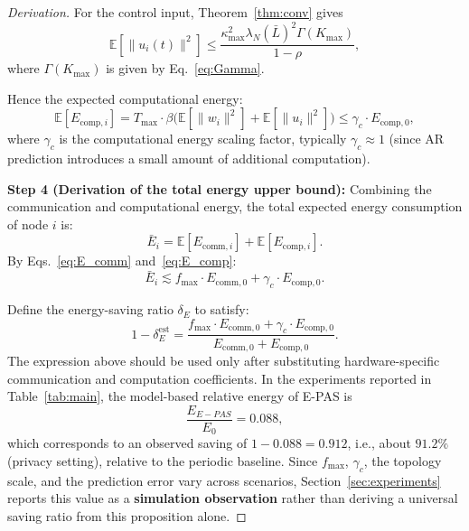 \documentclass[10pt]{article}
\newcommand{\EPAS}{E-PAS}
\newcommand{\Lbar}{\bar{L}}
\newcommand{\kmax}{\kappa_{\max}}
\newcommand{\lN}{\lambda_N(\Lbar)}
\newcommand{\fmax}{f_{\max}}
\begin{document}
\begin{proof}[Derivation]
For the control input, Theorem~\ref{thm:conv} gives
\begin{equation}
  \mathbb{E}[\|u_i(t)\|^2] \leq \frac{\kmax^2 \lN^2 \Gamma(K_{\max})}{1-\rho},
\end{equation}
where $\Gamma(K_{\max})$ is given by Eq.~\eqref{eq:Gamma}.

Hence the expected computational energy:
\begin{equation}\label{eq:E_comp}
  \mathbb{E}[E_{\mathrm{comp},i}] = T_{\max} \cdot \beta\bigl(\mathbb{E}[\|w_i\|^2] + \mathbb{E}[\|u_i\|^2]\bigr) \leq \gamma_c \cdot E_{\mathrm{comp},0},
\end{equation}
where $\gamma_c$ is the computational energy scaling factor, typically $\gamma_c \approx 1$ (since AR prediction introduces a small amount of additional computation).

\textbf{Step 4 (Derivation of the total energy upper bound):}
Combining the communication and computational energy, the total expected energy consumption of node $i$ is:
\begin{equation}
  \bar{E}_i = \mathbb{E}[E_{\mathrm{comm},i}] + \mathbb{E}[E_{\mathrm{comp},i}].
\end{equation}
By Eqs.~\eqref{eq:E_comm} and~\eqref{eq:E_comp}:
\begin{equation}
  \bar{E}_i \lesssim \fmax \cdot E_{\mathrm{comm},0} + \gamma_c \cdot E_{\mathrm{comp},0}.
\end{equation}

Define the energy-saving ratio $\delta_E$ to satisfy:
\begin{equation}
  1 - \delta_E^{\mathrm{est}} = \frac{\fmax \cdot E_{\mathrm{comm},0} + \gamma_c \cdot E_{\mathrm{comp},0}}{E_{\mathrm{comm},0} + E_{\mathrm{comp},0}}.
\end{equation}
The expression above should be used only after substituting hardware-specific communication and computation coefficients. In the experiments reported in Table~\ref{tab:main}, the model-based relative energy of \EPAS{} is
\begin{equation}
  \frac{E_{\EPAS}}{E_0}=0.088,
\end{equation}
which corresponds to an observed saving of $1-0.088=0.912$, i.e., about $91.2\%$ (privacy setting), relative to the periodic baseline. Since $\fmax$, $\gamma_c$, the topology scale, and the prediction error vary across scenarios, Section~\ref{sec:experiments} reports this value as a \textbf{simulation observation} rather than deriving a universal saving ratio from this proposition alone.
\end{proof}
\end{document}
